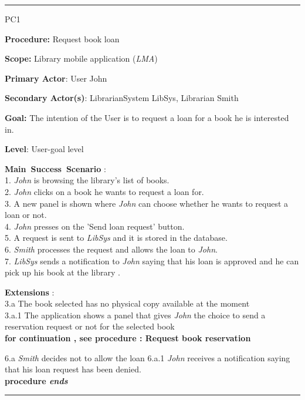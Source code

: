 \vspace{0.5cm}
\hrule
\begin{lyxlist}{PC1}
\small{
\item [\textbf{Procedure:}] Request book loan
\item [\textbf{Scope:}] Library mobile application (\emph{LMA})
\item [\textbf{Primary Actor}:] User John
\item [\textbf{Secondary Actor(s)}:] LibrarianSystem LibSys,
Librarian Smith
\item [\textbf{Goal:}] The intention of the User is to request a loan for a book
he is interested in.
\item [\textbf{Level}:] User-goal level
\item [\textbf{Main~Success~Scenario}]:\\
1. \emph{John} is browsing the library's list of books. \\
2. \emph{John} clicks on a book he wants to request a loan for. \\
3. A new panel is shown where \emph{John} can choose whether he wants to
request a loan or not. \\
4. \emph{John} presses on the 'Send loan request' button. \\
5. A request is sent to \emph{LibSys} and it is stored in the database. \\
6. \emph{Smith}  processes the request and allows the loan to \emph{John}.\\ 
7. \emph{LibSys} sends a notification to \emph{John} saying that his loan is
approved and he can pick up his book at the library .\\


\item [\textbf{Extensions}]:\\
3.a The book selected has no physical copy available at the moment\\
\hspace*{0.5cm} 3.a.1 The application shows a panel that gives \emph{John} the
choice to send a reservation request or not for the selected book \\
\hspace*{0.5cm} \textbf{for continuation , see procedure : Request book
reservation}

6.a \emph{Smith} decides not to allow the loan
\hspace*{0.5cm} 6.a.1 \emph{John} receives a notification saying that his loan
request has been denied.\\
\hspace*{0.5cm} \textbf{procedure \emph{ends}}

}

\end{lyxlist}
\hrule

